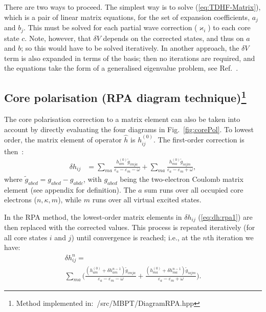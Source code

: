 \documentclass[10pt,twocolumn,a4paper]{article}%
\def\en{\ensuremath{\varepsilon}}
\renewcommand{\k}{\ensuremath{\kappa}}
\begin{document}
There are two ways to proceed.
The simplest way is to solve (\ref{eq:TDHF-Matrix}), which is a pair of linear matrix equations, for the set of expansion coefficients, $a_j$ and $b_j$.
This must be solved for each partial wave correction ($\varkappa_i$) to each core state $c$.
Note, however, that $\delta V$ depends on the corrected states, and thus on $a$ and $b$; so this would have to be solved iteratively.
In another approach, the $\delta V$ term is also expanded in terms of the basis; then no iterations are required, and the equations take the form of a generalised eigenvalue problem, see Ref.~\cite{Johnson1989}.





\subsection[Core polarisation (RPA diagram technique)]{Core polarisation (RPA diagram technique)\footnote{Method implemented in:~/src/MBPT/DiagramRPA.hpp}}

The core polarisation correction to a matrix element can also be taken into account by directly evaluating the four diagrams in Fig.~\ref{fig:corePol}.
To lowest order, the matrix element of operator $\hat h$ is $h_{ij}^{(0)}$. 
The first-order correction is then~\cite{Lindgren1986}:
\begin{align}
\delta h_{ij} &= 
\sum_{ma}\frac{h_{am}^{(0)}\widetilde g_{imja}}{\en_a - \en_m - \omega}
+ \sum_{ma}\frac{h_{ma}^{(0)}\widetilde g_{iajm}}{\en_a - \en_m + \omega},
\label{eq:dh:rpa1}
\end{align}
where
$ \widetilde g_{abcd} =  g_{abcd} -  g_{abdc}$, with 
$g_{abcd}$ being the two-electron Coulomb matrix element (see appendix for definition).
The $a$ sum runs over all occupied core electrons ($n,\k,m$), while $m$ runs over all virtual excited states.

In the RPA method, the lowest-order matrix elements in $\delta h_{ij}$ (\ref{eq:dh:rpa1}) are then replaced with the corrected values. This process is repeated iteratively (for all core states $i$ and $j$) until convergence is reached; i.e., at the $n$th iteration we have:
\begin{multline}
\delta h_{ij}^{n} = \\
\sum_{ma}\Bigg(\frac{(h_{am}^{(0)}+\delta h_{am}^{n-1})\widetilde g_{imja}}{\en_a - \en_m - \omega}
+ \frac{(h_{ma}^{(0)}+\delta h_{ma}^{n-1})\widetilde g_{iajm}}{\en_a - \en_m + \omega}\Bigg).
\end{multline}
\end{document}
